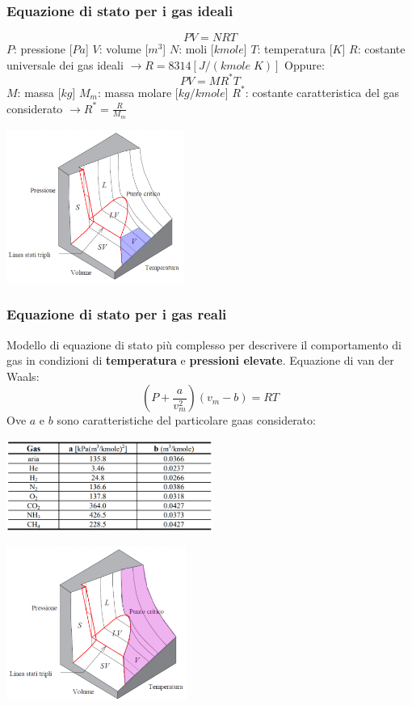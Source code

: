\subsubsection{Equazione di stato per i gas ideali}
\[
    PV=NRT
\]
$P$: pressione [$Pa$]\newline
$V$: volume [$m^3$]\newline
$N$: moli [$kmole$]\newline
$T$: temperatura [$K$]\newline
$R$: costante universale dei gas ideali $\rightarrow R = 8314 [J/(kmole \; K)]$\newline
Oppure:
\[
    PV = MR^*T
\]
$M$: massa [$kg$]\newline
$M_m$: massa molare [$kg/kmole$]\newline
$R^*$: costante caratteristica del gas considerato $\rightarrow R^* = \frac{R}{M_m}$
\begin{center}
    \includegraphics[height=5cm]{../L01/img5.PNG}
\end{center}
\subsubsection{Equazione di stato per i gas reali}
Modello di equazione di stato più complesso per descrivere il comportamento di gas in condizioni di \textbf{temperatura} e \textbf{pressioni elevate}.\newline
\newline
Equazione di van der Waals:
\[
    \left(P + \frac{a}{v_m^2}\right)(v_m - b) = RT
\]
Ove $a$ e $b$ sono caratteristiche del particolare gaas considerato:
\begin{center}
    \includegraphics[height=3cm]{../L01/img8.PNG}
\end{center}
\begin{center}
    \includegraphics[height=5cm]{../L01/img6.PNG}
\end{center}
